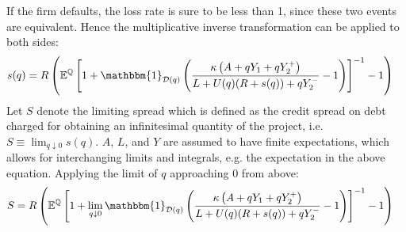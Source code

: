 \documentclass[../main.tex]{subfiles}
\begin{document}
        If the firm defaults, the loss rate is sure to be less than 1,
        since these two events are equivalent. 
        Hence the multiplicative inverse transformation can be applied to both sides:
            \begin{align}
                    s(q)
                &=
                    \grossrfrate
                    \left(
                        \mathbb{E}^{\rnmeasure}\left[
                            1
                            +
                            \mathbbm{1}_{\mathcal{D}(q)}
                            \left(
                                \frac{
                                    \kappa 
                                    \left(
                                        A + q Y_{1} + q Y_{2}^{+}
                                    \right)
                                }{
                                    L 
                                    +
                                    U(q)
                                    (\grossrfrate + s(q))
                                    +
                                    q Y_{2}^{-} 
                                }
                                -
                                1
                            \right) 
                        \right]^{-1}
                        - 
                        1
                    \right)
                \nonumber
            \end{align}
        Let $S$ denote the limiting spread which is defined as the credit spread on debt 
        charged for obtaining an infinitesimal quantity of the project, i.e.
        $S \equiv \lim_{q\downarrow 0} s(q)$.
        $A$, $L$, and $Y$ are assumed to have finite expectations, 
        which allows for interchanging limits and integrals, e.g. the expectation in the above equation.
        Applying the limit of $q$ approaching $0$ from above:
            \begin{align}
                    S
                &=
                    \grossrfrate
                    \left(
                        \mathbb{E}^{\rnmeasure}\left[
                            1
                            +
                            \lim_{q\downarrow 0}
                            \mathbbm{1}_{\mathcal{D}(q)}
                            \left(
                                \frac{
                                    \kappa 
                                    \left(
                                        A + q Y_{1} + q Y_{2}^{+}
                                    \right)
                                }{
                                    L 
                                    +
                                    U(q)
                                    (\grossrfrate + s(q))
                                    +
                                    q Y_{2}^{-} 
                                }
                                -
                                1
                            \right) 
                        \right]^{-1}
                        - 
                        1
                    \right)
                \nonumber
            \end{align}
\end{document}

